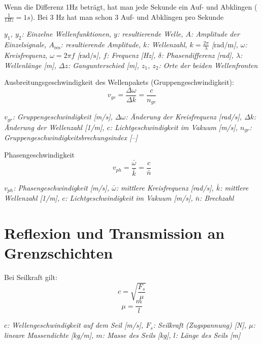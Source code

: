 \documentclass[a4paper,10pt]{article}
\newenvironment{displayformula}
{
	\begin{framed}
		\color{formulaColor}
	}
	{\end{framed}}
\newcommand{\formulalegend}[1]{%
	\par\vspace{0.5ex}%
	{{\color{legendColor}\RaggedRight\small\textit{#1}}}%
	\par\vspace{1.5ex}%
}
\begin{document}
Wenn die Differenz 1Hz beträgt, hat man jede Sekunde ein Auf- und Abklingen ($\frac{1}{1 Hz} = 1s$). Bei 3 Hz hat man schon 3 Auf- und Abklingen pro Sekunde
\formulalegend{
	$y_1$, $y_2$: Einzelne Wellenfunktionen, 
	$y$: resultierende Welle, 
	$A$: Amplitude der Einzelsignale, 
	$A_{\text{res}}$:  resultierende Amplitude, 
	$k$: Wellenzahl, $k = \frac{2\pi}{\lambda}$ [$\text{rad}/\text{m}$], 
	$\omega$: Kreisfrequenz, $\omega = 2\pi f$ [$\text{rad}/\text{s}$], 
	$f$: Frequenz [Hz], 
	$\delta$: Phasendifferenz [rad], 
	$\lambda$: Wellenlänge [m], 
	$\Delta z$: Gangunterschied [m], 
	$z_1$, $z_2$: Orte der beiden Wellenfronten
}

\begin{displayformula}
		Ausbreitungsgeschwindigkeit des Wellenpakets (Gruppengeschwindigkeit):
	\[
	v_{gr} = \frac{\Delta \omega}{\Delta k} = \frac{c}{n_{gr}}
	\]
\end{displayformula}
\formulalegend{
	\( v_{gr} \): Gruppengeschwindigkeit [m/s],
	\( \Delta \omega \): Änderung der Kreisfrequenz [rad/s],
	\( \Delta k \): Änderung der Wellenzahl [1/m],
	\( c \): Lichtgeschwindigkeit im Vakuum [m/s],
	\( n_{gr} \): Gruppengeschwindigkeitsbrechungsindex [–]
}


\begin{displayformula}
		Phasengeschwindigkeit
	\[
	v_{ph} = \frac{\bar{ \omega}}{\bar{k}} = \frac{c}{\bar{n}}
	\]
\end{displayformula}
\formulalegend{
	\( v_{ph} \): Phasengeschwindigkeit [m/s], 
	\( \bar{\omega} \): mittlere Kreisfrequenz [rad/s], 
	\( \bar{k} \): mittlere Wellenzahl [1/m], 
	\( c \): Lichtgeschwindigkeit im Vakuum [m/s], 
	\( \bar{n} \): Brechzahl
}


\section{Reflexion und Transmission an Grenzschichten}

\begin{displayformula}
Bei Seilkraft gilt: 
	\[
	c = \sqrt{\frac{F_s}{\mu}}
	\]
	\[
	\mu = \frac{m}{l}
	\]
\end{displayformula}
\formulalegend{
	\( c \): Wellengeschwindigkeit auf dem Seil [m/s], 
	\( F_s \): Seilkraft (Zugspannung) [N], 
	\( \mu \): lineare Massendichte [kg/m], 
	\( m \): Masse des Seils [kg], 
	\( l \): Länge des Seils [m]
}
\end{document}
